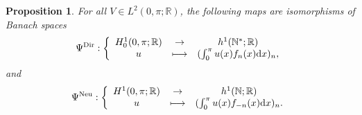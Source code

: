 \documentclass[11pt]{article}
\providecommand{\dpl}{\displaystyle}
\newcommand\mto{\mathchoice{\longmapsto}{\mapsto}{\mapsto}{\mapsto}}
\newtheorem{proposition}[theorem]{Proposition}
\theoremstyle{definition}
\begin{document}
\begin{proposition}
\label{prop_isom_Hilb}
For all $V\in L^2(0,\pi;\mathbb{R})$, the following maps are isomorphisms of Banach spaces
\[
\Psi^{\mathrm{Dir}}:\left\{ \begin{array}{ccc} H^1_0(0,\pi;\mathbb{R}) & \dpl\to & h^1(\mathbb{N}^*;\mathbb{R}) \\
u & \dpl\mto & (\int_0^\pi u(x) f_n(x) \mathrm{d}x)_n,
\end{array} \right.
\]
and
\[
\Psi^{\mathrm{Neu}}:\left\{ \begin{array}{ccc} H^1(0,\pi;\mathbb{R}) & \dpl\to & h^1(\mathbb{N};\mathbb{R}) \\
u & \dpl\mto & (\int_0^\pi u(x) f_{-n}(x) \mathrm{d}x)_n.
\end{array} \right.
\]
\end{proposition}
\end{document}
